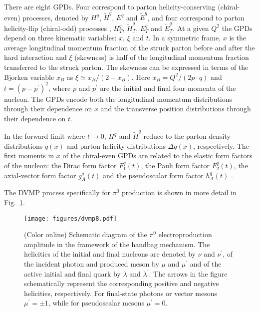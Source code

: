 \documentclass[prc,floatfix,twocolumn,superscriptaddress,letter]{revtex4}
\begin{document}
There are eight GPDs. Four correspond to  parton helicity-conserving (chiral-even) processes,  denoted 
by $H^q$,  $\tilde H^q$,  $E^q$ and  $\tilde E^q$, and 
four correspond to parton helicity-flip (chiral-odd) processes  \cite{diehl,ji},  $H^q_T$,  $\tilde H^q_T$,  $E^q_T$ and  $\tilde E^q_T$. 
At a given $Q^2$ the GPDs depend on three kinematic variables: $x$, $\xi$ and $t$. In  a symmetric frame,  $x$ is the   average longitudinal momentum fraction of the struck parton before and after the hard interaction and $\xi$ (skewness) is half of the longitudinal momentum fraction transferred to  the struck parton. The skewness can be expressed in terms of the   Bjorken variable $x_B$  as
$\xi\simeq x_B/(2-x_B)$. Here $x_B=Q^2/(2p\cdot q)$ and $t=(p-p^\prime)^2$, where $p$ and $p^\prime$ are the initial and final four-momenta of the nucleon. The GPDs encode both the longitudinal momentum distributions through their dependence on $x$ and the transverse position distributions through  their dependence on  $t$. 


In the forward limit where $t\to 0$,  $H^q$ and  $\tilde H^q$   reduce to the parton density distributions $q(x)$ and parton helicity distributions $\Delta q(x)$, respectively. The first moments in  $x$ of the chiral-even GPDs are related to the elastic form factors of the nucleon:  the Dirac form factor   $F_1^q(t)$,  the Pauli form factor  $F_2^q(t)$,  the axial-vector form factor  $g_A^q(t)$ and the  pseudoscalar form factor $h_A^q(t)$ \cite{polyakov}. 

The DVMP process specifically for  $\pi^0$ production is shown in more detail in Fig.~\ref{fig:handbag-pi0}. 
\begin{figure}[h]
\texttt{[image: figures/dvmp8.pdf]}
\caption{\label{fig:handbag-pi0} (Color online) Schematic diagram of the $\pi^0$ electroproduction amplitude in the framework of  the handbag mechanism.  The helicities of the initial and final nucleons are denoted by $\nu$ and $\nu^\prime$, of the incident photon and produced meson by $\mu$ and $\mu^\prime$ and of the active initial and final quark by $\lambda$ and $\lambda^\prime$. The arrows in the figure schematically represent the corresponding positive and negative helicities, respectively. For final-state photons or vector mesons $\mu^\prime = \pm 1$, while for pseudoscalar mesons $\mu^\prime =  0$.}
\end{figure}
\end{document}
